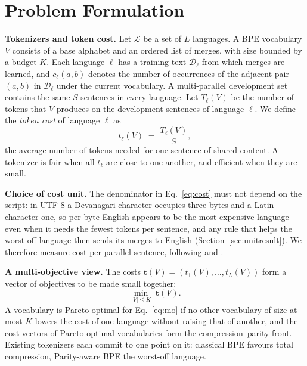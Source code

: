 \section{Problem Formulation}
\label{sec:problem}

\noindent\textbf{Tokenizers and token cost.}
Let $\mathcal{L}$ be a set of $L$ languages. A BPE vocabulary $V$ consists of a base
alphabet and an ordered list of merges, with size bounded by a budget $K$. Each language
$\ell$ has a training text $\mathcal{D}_\ell$ from which merges are learned, and
$c_\ell(a,b)$ denotes the number of occurrences of the adjacent pair $(a,b)$ in
$\mathcal{D}_\ell$ under the current vocabulary. A multi-parallel development set contains
the same $S$ sentences in every language. Let $T_\ell(V)$ be the number of tokens that $V$ produces on the development
sentences of language $\ell$. We define the \emph{token cost} of language $\ell$ as
\begin{equation}
  t_\ell(V) \;=\; \frac{T_\ell(V)}{S},
  \label{eq:cost}
\end{equation}
the average number of tokens needed for one sentence of shared content. A tokenizer is fair
when all $t_\ell$ are close to one another, and efficient when they are small.

\noindent\textbf{Choice of cost unit.}
The denominator in Eq.~\eqref{eq:cost} must not depend on the script: in UTF-8 a Devanagari
character occupies three bytes and a Latin character one, so per byte English appears to be
the most expensive language even when it needs the fewest tokens per sentence, and any rule
that helps the worst-off language then sends its merges to English
(Section~\ref{sec:unitresult}). We therefore measure cost per parallel sentence, following
\citet{petrov2023} and \citet{foroutan2026}.

\noindent\textbf{A multi-objective view.}
The costs $\mathbf{t}(V)=(t_1(V),\dots,t_L(V))$ form a vector of objectives to be made small
together:
\begin{equation}
  \min_{|V|\le K}\; \mathbf{t}(V).
  \label{eq:mo}
\end{equation}
A vocabulary is Pareto-optimal for Eq.~\eqref{eq:mo} if no other vocabulary of size at most
$K$ lowers the cost of one language without raising that of another, and the cost vectors
of Pareto-optimal vocabularies form the compression--parity front. Existing tokenizers each
commit to one point on it: classical BPE favours total compression, Parity-aware BPE the
worst-off language.


